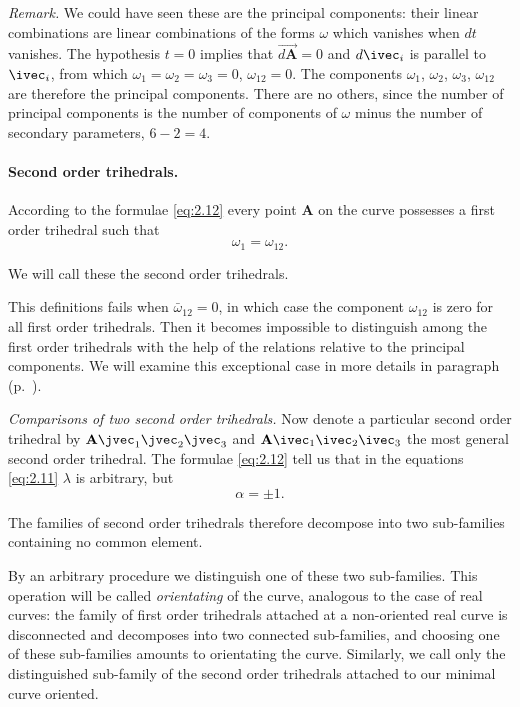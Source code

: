 \emph{Remark.} We could have seen these are the principal components: their linear combinations are linear combinations of the forms $\omega$ which vanishes when $dt$ vanishes. The hypothesis $t=0$ implies that $\overrightarrow{d\mathbf{A}}=0$ and $d\ivec_{i}$ is parallel to $\ivec_{i}$, from which $\omega_{1}=\omega_{2}=\omega_{3}=0$, $\omega_{12}=0$. The components $\omega_{1}$, $\omega_{2}$, $\omega_{3}$, $\omega_{12}$ are therefore the principal components. There are no others, since the number of principal components is the number of components of $\omega$ minus the number of secondary parameters, $6-2=4$.

\paragraph{Second order trihedrals.}
\label{sec:28}
According to the formulae \eqref{eq:2.12} every point $\mathbf{A}$ on the curve possesses a first order trihedral such that
\begin{equation}
  \label{eq:2.13}
  \omega_{1}=\omega_{12}.
\end{equation}

We will call these the second order trihedrals.

This definitions fails when $\bar\omega_{12}=0$, in which case the component $\omega_{12}$ is zero for all first order trihedrals. Then it becomes impossible to distinguish among the first order trihedrals with the help of the relations relative to the principal components. We will examine this exceptional case in more details in paragraph  (p.~\pageref{sec:30}).

\somespace

\emph{Comparisons of two second order trihedrals.} Now denote a particular second order trihedral by $\mathbf{A}\jvec_{1}\jvec_{2}\jvec_{3}$ and $\mathbf{A}\ivec_{1}\ivec_{2}\ivec_{3}$ the most general second order trihedral. The formulae \eqref{eq:2.12} tell us that in the equations \eqref{eq:2.11} $\lambda$ is arbitrary, but
\begin{equation}
  \label{eq:2.14}
  \alpha=\pm1.
\end{equation}

The families of second order trihedrals therefore decompose into two sub-families containing no common element.

By an arbitrary procedure we distinguish one of these two sub-families. This operation will be called \emph{orientating} of the curve, analogous to the case of real curves: the family of first order trihedrals attached at a non-oriented real curve is disconnected and decomposes into two connected sub-families, and choosing one of these sub-families amounts to orientating the curve. Similarly, we call only the distinguished sub-family of the second order trihedrals attached to our minimal curve oriented.

